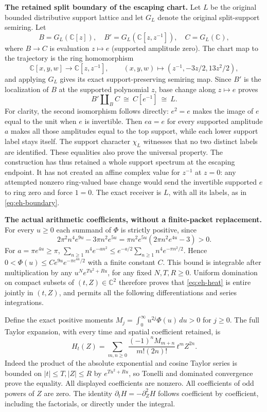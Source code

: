 \documentclass[11pt,a4paper]{article}
\theoremstyle{definition}\newtheorem{definition}[theorem]{Definition}
\begin{document}
\EH\textbf{The retained split boundary of the escaping chart.}
Let $L$ be the original bounded distributive support lattice and let
$G_L$ denote the original split-support semiring. Let
\[
 B=G_L(\mathbb C[z]),\quad B'=G_L(\mathbb C[z,z^{-1}]),\quad
 C=G_L(\mathbb C),
\]
where $B\to C$ is evaluation $z\mapsto e$ (supported amplitude zero).
The chart map to the trajectory is the ring homomorphism
\[
 \mathbb C[x,y,w]\longrightarrow\mathbb C[z,z^{-1}],\qquad
 (x,y,w)\longmapsto(z^{-1},-3z/2,13z^2/2),
\]
and applying $G_L$ gives its exact support-preserving semiring map.
Since $B'$ is the localization of $B$ at the supported polynomial $z$,
base change along $z\mapsto e$ proves
\begin{equation}
 B'\amalg_B C\ \cong\ C[e^{-1}]\ \cong\ L.\label{eq:eh-boundary}
\end{equation}
For clarity, the second isomorphism follows directly: $e^2=e$ makes
the image of $e$ equal to the unit when $e$ is invertible. Then
$ea=e$ for every supported amplitude $a$ makes all those amplitudes
equal to the top support, while each lower support label stays itself.
The support character $\chi_L$ witnesses that no two distinct labels
are identified. These equalities also prove the universal property.
The construction has thus retained a whole support spectrum at the
escaping endpoint. It has not created an affine complex value for
$z^{-1}$ at $z=0$: any attempted nonzero ring-valued base change
would send the invertible supported $e$ to ring zero and force $1=0$.
The exact receiver is $L$, with all its labels, as in
\eqref{eq:eh-boundary}.

\EH\textbf{The actual arithmetic coefficients, without a finite-packet replacement.}
For every $u\ge0$ each summand of $\Phi$ is strictly positive, since
\[
 2\pi^2n^4e^{9u}-3\pi n^2e^{5u}
 =\pi n^2e^{5u}(2\pi n^2e^{4u}-3)>0.
\]
For $a=\pi e^{4u}\ge\pi$,
$\sum_{n\ge1}n^4 e^{-an^2}\le
e^{-a/2}\sum_{n\ge1}n^4e^{-\pi n^2/2}$.
Hence $0<\Phi(u)\le C e^{9u}e^{-\pi e^{4u}/2}$ with a finite
constant $C$. This bound is integrable after multiplication by
any $u^N e^{T u^2+Ru}$, for any fixed $N,T,R\ge0$.
Uniform domination on compact subsets of $(t,Z)\in\mathbb C^2$
therefore proves that \eqref{eq:eh-heat} is entire jointly in $(t,Z)$,
and permits all the following differentiations and series integrations.

Define the exact positive moments
$M_j=\int_0^\infty u^{2j}\Phi(u)\,du>0$ for $j\ge0$. The full
Taylor expansion, with every time and spatial coefficient retained, is
\begin{equation}
 H_t(Z)=\sum_{m,n\ge0}
 \frac{(-1)^n M_{m+n}}{m!(2n)!}\,t^m Z^{2n}.\label{eq:eh-moments}
\end{equation}
Indeed the product of the absolute exponential and cosine Taylor series
is bounded on $|t|\le T,|Z|\le R$ by $e^{Tu^2+Ru}$, so Tonelli and
dominated convergence prove the equality. All displayed coefficients
are nonzero. All coefficients of odd powers of $Z$ are zero.
The identity $\partial_tH=-\partial_Z^2H$ follows coefficient by
coefficient, including the factorials, or directly under the integral.
\end{document}
